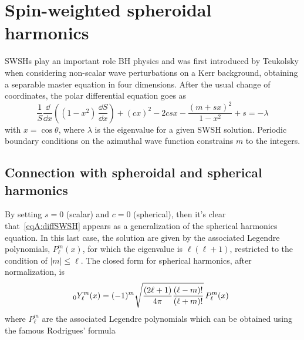 
\label{AppendixA} %
\chapter{Spin-weighted spheroidal harmonics} %

SWSHs play an important role BH physics and was first introduced by Teukolsky when considering non-scalar wave perturbations on a Kerr background, obtaining a separable master equation in four dimensions. After the usual change of coordinates, the polar differential equation goes as 
\begin{equation}
	\frac{1}{S} \frac{\dd}{\dd x} \left( (1-x^2) \, \frac{\dd S}{\dd x} \right) + (c x)^2 - 2 c s x  -\frac{(m + s x)^2}{1-x^2} + s  = - \lambda 
	\label{eqA:diffSWSH}
\end{equation}
with $x=\cos\theta$, where $\lambda$ is the eigenvalue for a given SWSH solution. Periodic boundary conditions on the azimuthal wave function constrains $m$ to the integers.   

\section{Connection with spheroidal and spherical harmonics}

By setting $s=0$ (scalar) and $c=0$ (spherical), then it's clear that~\eqref{eqA:diffSWSH} appears as a generalization of the spherical harmonics equation. In this last case, the solution are given by the associated Legendre polynomials, $P^m_\ell (x)$, for which the eigenvalue is $\ell(\ell+1)$, restricted to the condition of $|m| \le \ell$. The closed form for spherical harmonics, after normalization, is
\begin{equation}
	\sts[0]{Y^m}{\ell}(x)=(-1)^{m}{\sqrt {{(2\ell +1) \over 4\pi }{(\ell -m)! \over (\ell +m)!}}}\,P_{\ell }^{m}(x) ~
	\label{eqA:SH}
\end{equation}
where $P_{\ell }^{m}$ are the associated Legendre polynomials which can be obtained using the famous Rodrigues' formula